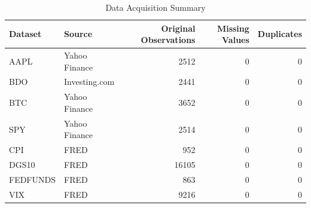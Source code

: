 \begin{table}[H]
  \centering
  \caption{Data Acquisition Summary}
  \label{tab:data_acq}
  \begin{tabular}{l l r r r}
    \toprule
    Dataset & Source & {Original Observations} & {Missing Values} & {Duplicates} \\
    \midrule
    AAPL   & Yahoo Finance  & 2512 & 0 & 0 \\
    BDO    & Investing.com  & 2441 & 0 & 0 \\
    BTC    & Yahoo Finance  & 3652 & 0 & 0 \\
    SPY    & Yahoo Finance  & 2514 & 0 & 0 \\
    CPI    & FRED           & 952  & 0 & 0 \\
    DGS10  & FRED           & 16105 & 0 & 0 \\
    FEDFUNDS & FRED         & 863  & 0 & 0 \\
    VIX    & FRED           & 9216 & 0 & 0 \\
    \bottomrule
  \end{tabular}
\end{table}
